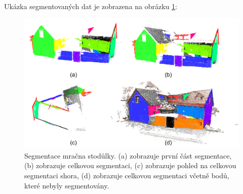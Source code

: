 \documentclass[11pt,twoside,a4paper]{book}
\begin{document}
Ukázka segmentovaných dat je zobrazena na obrázku \ref{fig:test-st}:  

\begin{figure}[H]
\begin{center}
\includegraphics[width=\textwidth]{figures/test-st}
\caption{Segmentace mračna stodůlky. (a) zobrazuje první část segmentace, (b) zobrazuje celkovou segmentaci, (c) zobrazuje pohled na celkovou segmentaci shora, (d) zobrazuje celkovou segmentaci včetně bodů, které nebyly segmentovány.}
\label{fig:test-st}
\end{center}
\end{figure}
\end{document}

